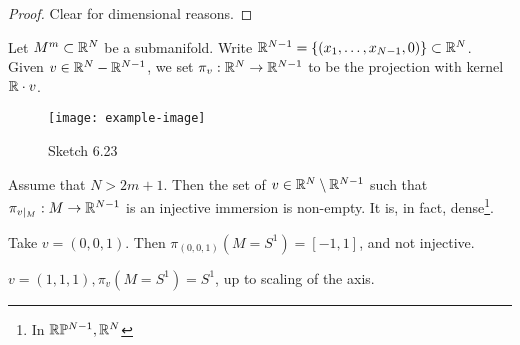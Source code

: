 \begin{proof}
    Clear for dimensional reasons.
\end{proof}

\begin{corollary}\label{cor:6.11}
    Let \(M^m\subset \mathbb{R}^N\) be a submanifold. Write \(\mathbb{R}^{N-1}=\{(x_1,\dots,x_{N-1},0)\}\subset\mathbb{R}^N\).
    Given \(v\in\mathbb{R}^{N}-\mathbb{R}^{N-1}\), we set \(\pi_v:\mathbb{R}^N\to\mathbb{R}^{N-1}\) to be the projection with kernel \(\mathbb{R}\cdot v\).
    \begin{figure}[H]\label{fig:6.23}
        \centering
        \texttt{[image: example-image]}
        \caption{Sketch 6.23}
    \end{figure}
    Assume that \(N>2m+1\). Then the set of \(v\in\mathbb{R}^{N}\setminus\mathbb{R}^{N-1}\) such that \(\pi_{v\mid_M}:M\to\mathbb{R}^{N-1}\)
    is an injective immersion is non-empty. It is, in fact, dense\footnote{In \(\mathbb{R}\mathbb{P}^{N-1}, \mathbb{R}^{N}\)}.

\end{corollary}

\begin{example}
    Take \(v=(0,0,1)\). Then \(\pi_{(0,0,1)}(M=S^1)=[-1,1]\), and not injective.
\end{example}

\begin{example}
    \(v=(1,1,1),\pi_v(M=S^1)=S^1\), up to scaling of the axis. %
\end{example}

